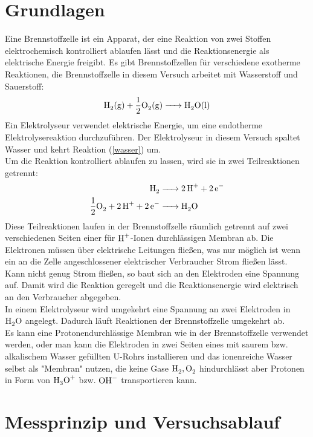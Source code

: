 \documentclass[a4paper,12pt,bibtotocnumbered]{scrartcl}
\numberwithin{equation}{section} %
\begin{document}
\section{Grundlagen}
Eine Brennstoffzelle ist ein Apparat, der eine Reaktion von zwei Stoffen elektrochemisch kontrolliert ablaufen lässt und die Reaktionsenergie als elektrische Energie freigibt. Es gibt Brennstoffzellen für verschiedene exotherme Reaktionen, die Brennstoffzelle in diesem Versuch arbeitet mit Wasserstoff und Sauerstoff:
\begin{equation}\label{wasser}
\ce{H_2(g) + \frac{1}{2}O_2(g) -> H_2O(l)}
\end{equation}
Ein Elektrolyseur verwendet elektrische Energie, um eine endotherme Elektrolysereaktion durchzuführen. Der Elektrolyseur in diesem Versuch spaltet Wasser und kehrt Reaktion (\ref{wasser}) um.\\
Um die Reaktion kontrolliert ablaufen zu lassen, wird sie in zwei Teilreaktionen getrennt:
\begin{align}
\ce{H_2 &-> 2H^+ + 2e^-} \\
\ce{\frac{1}{2}O_2 + 2H^+ + 2e^- &->H_2O}
\end{align}
Diese Teilreaktionen laufen in der Brennstoffzelle räumlich getrennt auf zwei verschiedenen Seiten einer für $\ce{H^+}$-Ionen durchlässigen Membran ab. Die Elektronen müssen über elektrische Leitungen fließen, was nur möglich ist wenn ein an die Zelle angeschlossener elektrischer Verbraucher Strom fließen lässt. Kann nicht genug Strom fließen, so baut sich an den Elektroden eine Spannung auf. Damit wird die Reaktion geregelt und die Reaktionsenergie wird elektrisch an den Verbraucher abgegeben.\\
In einem Elektrolyseur wird umgekehrt eine Spannung an zwei Elektroden in $\ce{H_2O}$ angelegt. Dadurch läuft Reaktionen der Brennstoffzelle umgekehrt ab. \\
Es kann eine Protonendurchlässige Membran wie in der Brennstoffzelle verwendet werden, oder man kann die Elektroden in zwei Seiten eines mit saurem bzw. alkalischem Wasser gefüllten U-Rohrs installieren und das ionenreiche Wasser selbst als "Membran" nutzen, die keine Gase $\ce{H_2},\ce{O_2}$ hindurchlässt aber Protonen in Form von $\ce{H_3O^+}$ bzw. $\ce{OH^-}$ transportieren kann.\\



\section[Messprinzip]{Messprinzip und Versuchsablauf}
\end{document}

